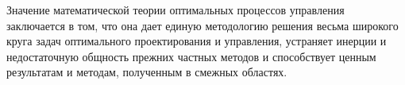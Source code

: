 Значение математической теории оптимальных процессов управления заключается в том, что она дает единую методологию решения весьма широкого круга задач оптимального проектирования и управления, устраняет инерции и недостаточную общность прежних частных методов и способствует ценным результатам и методам, полученным в смежных областях.
